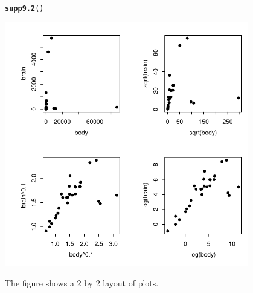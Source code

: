 \documentclass[12pt, a4paper,  BCOR=8.25mm, DIV=15]{scrartcl}\usepackage[]{graphicx}\usepackage[]{color}
\makeatletter
\newcommand{\hlstd}[1]{\textcolor[rgb]{0.345,0.345,0.345}{#1}}%
\newcommand{\hlkwd}[1]{\textcolor[rgb]{0.737,0.353,0.396}{\textbf{#1}}}%
\newenvironment{kframe}{%
 \def\at@end@of@kframe{}%
 \ifinner\ifhmode%
  \def\at@end@of@kframe{\end{minipage}}%
  \begin{minipage}{\columnwidth}%
 \fi\fi%
 \def\FrameCommand##1{\hskip\@totalleftmargin \hskip-\fboxsep
 \colorbox{shadecolor}{##1}\hskip-\fboxsep
     \hskip-\linewidth \hskip-\@totalleftmargin \hskip\columnwidth}%
 \MakeFramed {\advance\hsize-\width
   \@totalleftmargin\z@ \linewidth\hsize
   \@setminipage}}%
 {\par\unskip\endMakeFramed%
 \at@end@of@kframe}
\newenvironment{knitrout}{}{} %
\makeatother
\begin{document}
\begin{suppfigure}[ht]
\begin{knitrout}
\color{fgcolor}\begin{kframe}
\begin{alltt}
\hlkwd{supp9.2}\hlstd{()}
\end{alltt}
\end{kframe}

{\centering \includegraphics[width=0.8\textwidth]{figs/gph-supp9_2e-1} 

}



\end{knitrout}
\caption{The figure shows a 2 by 2 layout of plots.}
\end{suppfigure}
\end{document}

